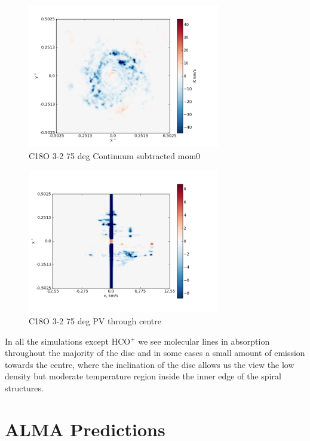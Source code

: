 \documentclass[useAMS,usenatbib]{mn2e}
\begin{document}
\begin{figure}
 \includegraphics[width=84mm]{Figures/sim/imageC18O_3-2_75deg_contSub.png}

 \caption{C18O 3-2 75 deg Continuum subtracted mom0}
\end{figure}

%

\begin{figure}
 \includegraphics[width=84mm]{Figures/sim/imageC18O_3-2_75deg_PV_centre.png}

 \caption{C18O 3-2 75 deg PV through centre}
\end{figure}


In all the simulations except HCO$^+$ we see molecular lines in absorption throughout the majority of the disc and in some cases a small amount of emission towards the centre, where the inclination of the disc allows us the view the low density but moderate temperature region inside the inner edge of the spiral structures.\newline




\section{ALMA Predictions}
\end{document}
